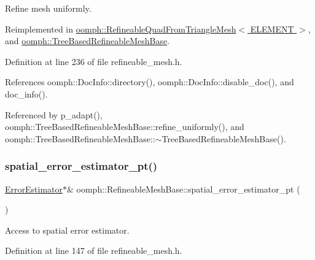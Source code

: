 Refine mesh uniformly. 



Reimplemented in \hyperlink{classoomph_1_1RefineableQuadFromTriangleMesh_a73e88bb8c1cc8464f079e928e89a4a14}{oomph\+::\+Refineable\+Quad\+From\+Triangle\+Mesh$<$ E\+L\+E\+M\+E\+N\+T $>$}, and \hyperlink{classoomph_1_1TreeBasedRefineableMeshBase_a8e67b50fecb03fe1ac93dcb81e4ac6e9}{oomph\+::\+Tree\+Based\+Refineable\+Mesh\+Base}.



Definition at line 236 of file refineable\+\_\+mesh.\+h.



References oomph\+::\+Doc\+Info\+::directory(), oomph\+::\+Doc\+Info\+::disable\+\_\+doc(), and doc\+\_\+info().



Referenced by p\+\_\+adapt(), oomph\+::\+Tree\+Based\+Refineable\+Mesh\+Base\+::refine\+\_\+uniformly(), and oomph\+::\+Tree\+Based\+Refineable\+Mesh\+Base\+::$\sim$\+Tree\+Based\+Refineable\+Mesh\+Base().

\mbox{\label{classoomph_1_1RefineableMeshBase_af8bb7a00156a9ddc54bdfccc988fd413}} 
\subsubsection{\texorpdfstring{spatial\+\_\+error\+\_\+estimator\+\_\+pt()}{spatial\_error\_estimator\_pt()}\hspace{0.1cm}{\footnotesize\ttfamily [1/2]}}
{\footnotesize\ttfamily \hyperlink{classoomph_1_1ErrorEstimator}{Error\+Estimator}$\ast$\& oomph\+::\+Refineable\+Mesh\+Base\+::spatial\+\_\+error\+\_\+estimator\+\_\+pt (\begin{DoxyParamCaption}{ }\end{DoxyParamCaption})\hspace{0.3cm}{\ttfamily [inline]}}



Access to spatial error estimator. 



Definition at line 147 of file refineable\+\_\+mesh.\+h.



